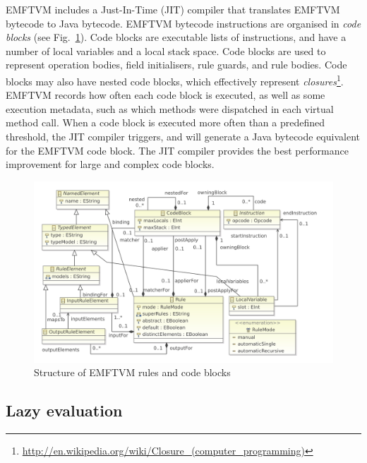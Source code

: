 \documentclass[submission,copyright,creativecommons]{eptcs}
\begin{document}
EMFTVM includes a Just-In-Time (JIT) compiler that translates EMFTVM bytecode to Java bytecode. EMFTVM bytecode instructions are organised in \emph{code blocks} (see Fig.~\ref{fig:emftvm-rules}). Code blocks are executable lists of instructions, and have a number of local variables and a local stack space. Code blocks are used to represent operation bodies, field initialisers, rule guards, and rule bodies. Code blocks may also have nested code blocks, which effectively represent \emph{closures}\footnote{\url{http://en.wikipedia.org/wiki/Closure\_(computer_programming)}}. EMFTVM records how often each code block is executed, as well as some execution metadata, such as which methods were dispatched in each virtual method call. When a code block is executed more often than a predefined threshold, the JIT compiler triggers, and will generate a Java bytecode equivalent for the EMFTVM code block. The JIT compiler provides the best performance improvement for large and complex code blocks.

\begin{figure}[ht]
\centerline{
\includegraphics[width=12cm]{figures/emftvm-rules-stripped}}
\caption{Structure of EMFTVM rules and code blocks}
\label{fig:emftvm-rules}
\end{figure}

\subsection{Lazy evaluation}
\end{document}
